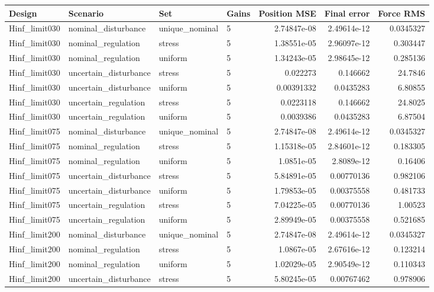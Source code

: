 \begin{tabular}{llllrrr}
\hline
Design & Scenario & Set & Gains & Position MSE & Final error & Force RMS \\
\hline
Hinf\_limit030 & nominal\_disturbance & unique\_nominal & 5 & 2.74847e-08 & 2.49614e-12 & 0.0345327 \\
Hinf\_limit030 & nominal\_regulation & stress & 5 & 1.38551e-05 & 2.96097e-12 & 0.303447 \\
Hinf\_limit030 & nominal\_regulation & uniform & 5 & 1.34243e-05 & 2.98645e-12 & 0.285136 \\
Hinf\_limit030 & uncertain\_disturbance & stress & 5 & 0.022273 & 0.146662 & 24.7846 \\
Hinf\_limit030 & uncertain\_disturbance & uniform & 5 & 0.00391332 & 0.0435283 & 6.80855 \\
Hinf\_limit030 & uncertain\_regulation & stress & 5 & 0.0223118 & 0.146662 & 24.8025 \\
Hinf\_limit030 & uncertain\_regulation & uniform & 5 & 0.0039386 & 0.0435283 & 6.87504 \\
Hinf\_limit075 & nominal\_disturbance & unique\_nominal & 5 & 2.74847e-08 & 2.49614e-12 & 0.0345327 \\
Hinf\_limit075 & nominal\_regulation & stress & 5 & 1.15318e-05 & 2.84601e-12 & 0.183305 \\
Hinf\_limit075 & nominal\_regulation & uniform & 5 & 1.0851e-05 & 2.8089e-12 & 0.16406 \\
Hinf\_limit075 & uncertain\_disturbance & stress & 5 & 5.84891e-05 & 0.00770136 & 0.982106 \\
Hinf\_limit075 & uncertain\_disturbance & uniform & 5 & 1.79853e-05 & 0.00375558 & 0.481733 \\
Hinf\_limit075 & uncertain\_regulation & stress & 5 & 7.04225e-05 & 0.00770136 & 1.00523 \\
Hinf\_limit075 & uncertain\_regulation & uniform & 5 & 2.89949e-05 & 0.00375558 & 0.521685 \\
Hinf\_limit200 & nominal\_disturbance & unique\_nominal & 5 & 2.74847e-08 & 2.49614e-12 & 0.0345327 \\
Hinf\_limit200 & nominal\_regulation & stress & 5 & 1.0867e-05 & 2.67616e-12 & 0.123214 \\
Hinf\_limit200 & nominal\_regulation & uniform & 5 & 1.02029e-05 & 2.90549e-12 & 0.110343 \\
Hinf\_limit200 & uncertain\_disturbance & stress & 5 & 5.80245e-05 & 0.00767462 & 0.978906 \\

\end{tabular}

